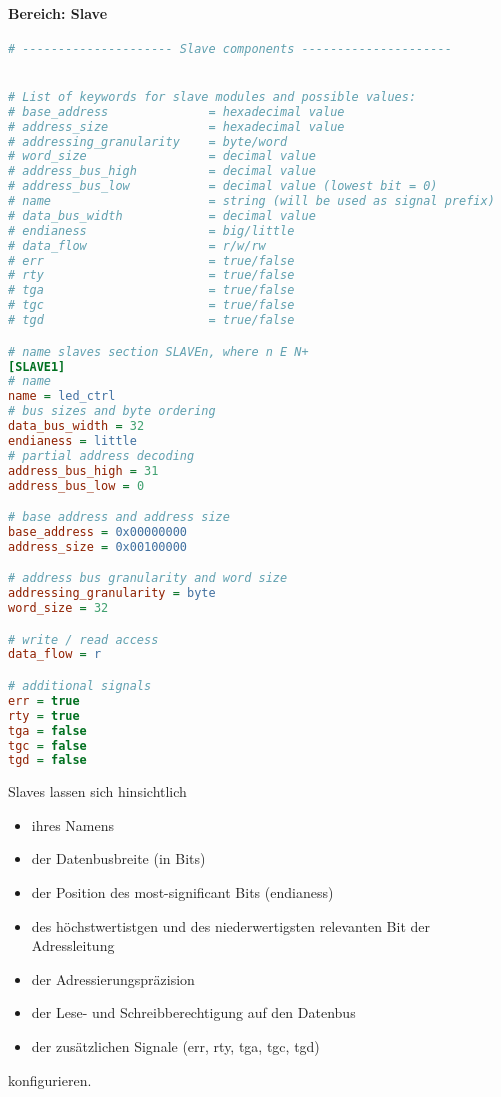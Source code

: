 \documentclass{article}
\newcommand{\nl}{\leavevmode\newline}
\begin{document}
\paragraph{Bereich: Slave}\nl
\begin{lstlisting}[language={Ini},frame=single]
# --------------------- Slave components ---------------------


# List of keywords for slave modules and possible values:
# base_address              = hexadecimal value
# address_size              = hexadecimal value
# addressing_granularity    = byte/word
# word_size                 = decimal value
# address_bus_high          = decimal value
# address_bus_low           = decimal value (lowest bit = 0)
# name                      = string (will be used as signal prefix)
# data_bus_width            = decimal value
# endianess                 = big/little
# data_flow                 = r/w/rw
# err                       = true/false
# rty                       = true/false
# tga                       = true/false
# tgc                       = true/false
# tgd                       = true/false

# name slaves section SLAVEn, where n E N+
[SLAVE1]
# name
name = led_ctrl
# bus sizes and byte ordering
data_bus_width = 32
endianess = little
# partial address decoding
address_bus_high = 31
address_bus_low = 0

# base address and address size
base_address = 0x00000000
address_size = 0x00100000

# address bus granularity and word size
addressing_granularity = byte
word_size = 32

# write / read access
data_flow = r

# additional signals
err = true
rty = true
tga = false
tgc = false
tgd = false
\end{lstlisting}
Slaves lassen sich hinsichtlich
\begin{itemize}
\item ihres Namens
\item der Datenbusbreite (in Bits)
\item der Position des most-significant Bits (endianess)
\item des höchstwertistgen und des niederwertigsten relevanten Bit der Adressleitung
\item der Adressierungspräzision
\item der Lese- und Schreibberechtigung auf den Datenbus
\item der zusätzlichen Signale (err, rty, tga, tgc, tgd)
\end{itemize}
konfigurieren.
\end{document}
